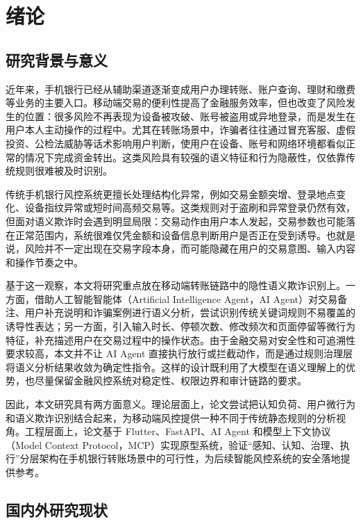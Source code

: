 \documentclass{xduugthesis}
\begin{document}
\chapter{绪论}

\section{研究背景与意义}

近年来，手机银行已经从辅助渠道逐渐变成用户办理转账、账户查询、理财和缴费等业务的主要入口。移动端交易的便利性提高了金融服务效率，但也改变了风险发生的位置：很多风险不再表现为设备被攻破、账号被盗用或异地登录，而是发生在用户本人主动操作的过程中。尤其在转账场景中，诈骗者往往通过冒充客服、虚假投资、公检法威胁等话术影响用户判断，使用户在设备、账号和网络环境都看似正常的情况下完成资金转出。这类风险具有较强的语义特征和行为隐蔽性，仅依靠传统规则很难被及时识别\cite{ahi2025risks}。

传统手机银行风控系统更擅长处理结构化异常，例如交易金额突增、登录地点变化、设备指纹异常或短时间高频交易等。这类规则对于盗刷和异常登录仍然有效，但面对语义欺诈时会遇到明显局限：交易动作由用户本人发起，交易参数也可能落在正常范围内，系统很难仅凭金额和设备信息判断用户是否正在受到诱导。也就是说，风险并不一定出现在交易字段本身，而可能隐藏在用户的交易意图、输入内容和操作节奏之中。

基于这一观察，本文将研究重点放在移动端转账链路中的隐性语义欺诈识别上。一方面，借助人工智能智能体（Artificial Intelligence Agent，AI Agent）对交易备注、用户补充说明和诈骗案例进行语义分析，尝试识别传统关键词规则不易覆盖的诱导性表达；另一方面，引入输入时长、停顿次数、修改频次和页面停留等微行为特征，补充描述用户在交易过程中的操作状态。由于金融交易对安全性和可追溯性要求较高，本文并不让 AI Agent 直接执行放行或拦截动作，而是通过规则治理层将语义分析结果收敛为确定性指令。这样的设计既利用了大模型在语义理解上的优势，也尽量保留金融风控系统对稳定性、权限边界和审计链路的要求\cite{kurshan2025agentic}。

因此，本文研究具有两方面意义。理论层面上，论文尝试把认知负荷、用户微行为和语义欺诈识别结合起来，为移动端风控提供一种不同于传统静态规则的分析视角。工程层面上，论文基于 Flutter、FastAPI、AI Agent 和模型上下文协议（Model Context Protocol，MCP）实现原型系统，验证“感知、认知、治理、执行”分层架构在手机银行转账场景中的可行性，为后续智能风控系统的安全落地提供参考\cite{anthropic2024mcp}。

\section{国内外研究现状}
\end{document}
